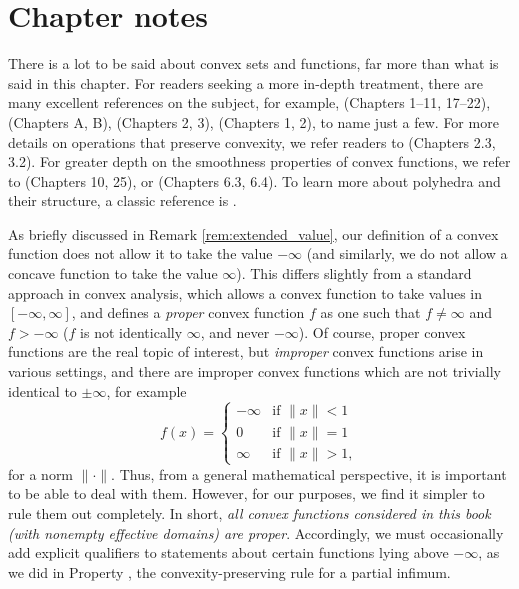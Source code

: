 \SkipTocEntry\section*{Chapter notes}

There is a lot to be said about convex sets and functions, far more than what is
said in this chapter. For readers seeking a more in-depth treatment, there are
many excellent references on the subject, for example,
\cite{rockafellar1970convex} (Chapters 1--11, 17--22),
\cite{hiriartUrruty2001fundamentals} (Chapters A, B), \cite{boyd2004convex}
(Chapters 2, 3), \cite{bertsekas2009convex} (Chapters 1, 2), to name just a
few. For more details on operations that preserve convexity, we refer readers to 
\cite{boyd2004convex} (Chapters 2.3, 3.2). For greater depth on the smoothness
properties of convex functions, we refer to \cite{rockafellar1970convex}
(Chapters 10, 25), or \cite{evans2015measure} (Chapters 6.3, 6.4). To learn more
about polyhedra and their structure, a classic reference is
\cite{grunbaum2003convex}.  

As briefly discussed in Remark \ref{rem:extended_value}, our definition of a
convex function does not allow it to take the value $-\infty$ (and similarly, we
do not allow a concave function to take the value $\infty$). This differs
slightly from a standard approach in convex analysis, which allows a convex
function to take values in $[-\infty,\infty]$, and defines a \emph{proper}
convex function $f$ as one such that $f \not= \infty$ and $f > -\infty$ ($f$ is
not identically $\infty$, and never $-\infty$). Of course, proper convex
functions are the real topic of interest, but \emph{improper} convex functions
arise in various settings, and there are improper convex functions which are not
trivially identical to $\pm \infty$, for example
\[
f(x) = \begin{cases}
-\infty & \text{if $\|x\| < 1$} \\
0 & \text{if $\|x\| = 1$} \\
\infty & \text{if $\|x\| > 1$},
\end{cases}
\]
for a norm $\|\cdot\|$. Thus, from a general mathematical perspective, it is
important to be able to deal with them. However, for our purposes, we find it
simpler to rule them out completely. In short, \emph{all convex functions
  considered in this book (with nonempty effective domains) are
  proper}. Accordingly, we must occasionally add  explicit qualifiers to
statements about certain functions lying above $-\infty$, as we did in Property
, the convexity-preserving rule for a partial
infimum.  

